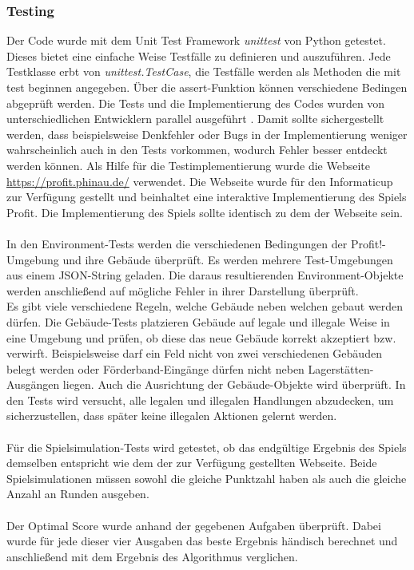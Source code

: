 \subsubsection*{Testing}
Der Code wurde mit dem Unit Test Framework \textit{unittest} von Python getestet. Dieses bietet eine einfache Weise Testfälle zu definieren und auszuführen. 
Jede Testklasse erbt von \textit{unittest.TestCase}, die Testfälle werden als Methoden die mit test beginnen angegeben. Über die assert-Funktion können verschiedene Bedingen abgeprüft werden.
Die Tests und die Implementierung des Codes wurden von unterschiedlichen Entwicklern parallel ausgeführt . Damit sollte sichergestellt werden, dass beispielsweise Denkfehler oder Bugs in der Implementierung weniger wahrscheinlich auch in den Tests vorkommen, wodurch Fehler besser entdeckt werden können. 
Als Hilfe für die Testimplementierung wurde die Webseite \url{https://profit.phinau.de/}  verwendet. Die Webseite wurde für den Informaticup zur Verfügung gestellt und beinhaltet eine interaktive Implementierung des Spiels Profit. Die Implementierung des Spiels sollte identisch zu dem der Webseite sein.
\\\\
In den Environment-Tests werden die verschiedenen Bedingungen der \dq{}Profit!\dq{}-Umgebung und ihre Gebäude überprüft.
Es werden mehrere Test-Umgebungen aus einem JSON-String geladen. Die daraus resultierenden Environment-Objekte werden anschließend auf mögliche Fehler in ihrer Darstellung überprüft.
\\
Es gibt viele verschiedene Regeln, welche Gebäude neben welchen gebaut werden dürfen. Die Gebäude-Tests platzieren Gebäude auf legale und illegale Weise in eine Umgebung und prüfen, ob diese das neue Gebäude korrekt akzeptiert bzw. verwirft. 
Beispielsweise darf ein Feld nicht von zwei verschiedenen Gebäuden belegt werden oder Förderband-Eingänge dürfen nicht neben Lagerstätten-Ausgängen liegen. Auch die Ausrichtung der Gebäude-Objekte wird überprüft.
In den Tests wird versucht, alle legalen und illegalen Handlungen abzudecken, um sicherzustellen, dass später keine illegalen Aktionen gelernt werden. 
\\\\
Für die Spielsimulation-Tests wird getestet, ob das endgültige Ergebnis des Spiels demselben entspricht wie dem der zur Verfügung gestellten Webseite. Beide Spielsimulationen müssen sowohl die gleiche Punktzahl haben als auch die gleiche Anzahl an Runden ausgeben. 
\\\\
Der Optimal Score wurde anhand der gegebenen Aufgaben überprüft. Dabei wurde für jede dieser vier Ausgaben das beste Ergebnis händisch berechnet und anschließend mit dem Ergebnis des Algorithmus verglichen.



